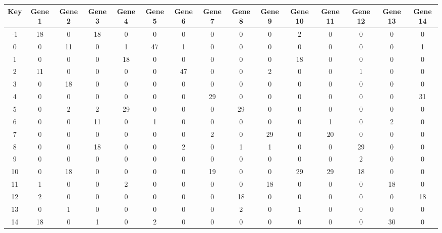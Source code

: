\begin{tabular}{|c|c|c|c|c|c|c|c|c|c|c|c|c|c|c|}
\hline
Key & Gene 1 & Gene 2 & Gene 3 & Gene 4 & Gene 5 & Gene 6 & Gene 7 & Gene 8 & Gene 9 & Gene 10 & Gene 11 & Gene 12 & Gene 13 & Gene 14 \\
\hline
-1 & 18 & 0 & 18 & 0 & 0 & 0 & 0 & 0 & 0 & 2 & 0 & 0 & 0 & 0 \\
0 & 0 & 11 & 0 & 1 & 47 & 1 & 0 & 0 & 0 & 0 & 0 & 0 & 0 & 1 \\
1 & 0 & 0 & 0 & 18 & 0 & 0 & 0 & 0 & 0 & 18 & 0 & 0 & 0 & 0 \\
2 & 11 & 0 & 0 & 0 & 0 & 47 & 0 & 0 & 2 & 0 & 0 & 1 & 0 & 0 \\
3 & 0 & 18 & 0 & 0 & 0 & 0 & 0 & 0 & 0 & 0 & 0 & 0 & 0 & 0 \\
4 & 0 & 0 & 0 & 0 & 0 & 0 & 29 & 0 & 0 & 0 & 0 & 0 & 0 & 31 \\
5 & 0 & 2 & 2 & 29 & 0 & 0 & 0 & 29 & 0 & 0 & 0 & 0 & 0 & 0 \\
6 & 0 & 0 & 11 & 0 & 1 & 0 & 0 & 0 & 0 & 0 & 1 & 0 & 2 & 0 \\
7 & 0 & 0 & 0 & 0 & 0 & 0 & 2 & 0 & 29 & 0 & 20 & 0 & 0 & 0 \\
8 & 0 & 0 & 18 & 0 & 0 & 2 & 0 & 1 & 1 & 0 & 0 & 29 & 0 & 0 \\
9 & 0 & 0 & 0 & 0 & 0 & 0 & 0 & 0 & 0 & 0 & 0 & 2 & 0 & 0 \\
10 & 0 & 18 & 0 & 0 & 0 & 0 & 19 & 0 & 0 & 29 & 29 & 18 & 0 & 0 \\
11 & 1 & 0 & 0 & 2 & 0 & 0 & 0 & 0 & 18 & 0 & 0 & 0 & 18 & 0 \\
12 & 2 & 0 & 0 & 0 & 0 & 0 & 0 & 18 & 0 & 0 & 0 & 0 & 0 & 18 \\
13 & 0 & 1 & 0 & 0 & 0 & 0 & 0 & 2 & 0 & 1 & 0 & 0 & 0 & 0 \\
14 & 18 & 0 & 1 & 0 & 2 & 0 & 0 & 0 & 0 & 0 & 0 & 0 & 30 & 0 \\
\hline
\end{tabular}